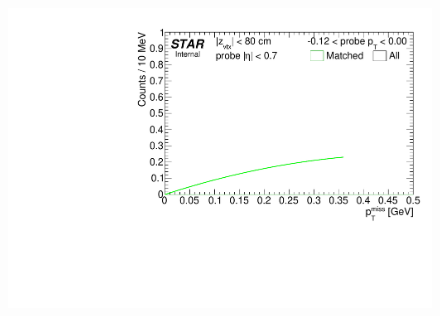 \begin{figure}[ht]
{  \includegraphics[width=\linewidth,page=9]{graphics/systematicsEfficiency/TOF_tagAndProbe/Fitting_effVsPt_mc.pdf}
}%
\end{figure}
